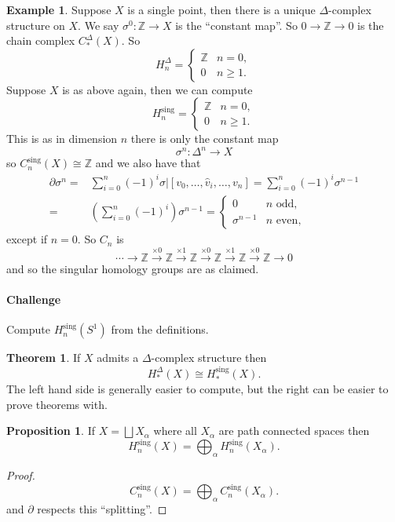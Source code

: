 \documentclass[12pt]{article}
\theoremstyle{definition}
\newtheorem*{thm}{Theorem}
\newtheorem*{prop}{Proposition}
\theoremstyle{definition}
\newtheorem*{ex}{Example}
\newcommand{\ZZ}{\mathbb{Z}}
\newcommand{\C}{C_*}
\renewcommand{\H}{H_*}
\begin{document}
\begin{ex}
Suppose $X$ is a single point, then there is a unique $\Delta$-complex structure on $X$.
We say $\sigma^0\colon \ZZ \to X$ is the ``constant map''.
So $0 \to \ZZ \to 0$ is the chain complex $\C^\Delta(X)$.
So
\[
H_n^\Delta =\begin{cases}\ZZ &n=0,\\
0 &n\ge 1.
\end{cases} 
\]
Suppose $X$ is as above again, then we can compute
\[
H_n^\text{sing} =\begin{cases}\ZZ &n=0,\\
0 &n\ge 1.
\end{cases}
\]
This is as in dimension $n$ there is only the constant map
\[
\sigma^n \colon \Delta^n \to X
\]
so $C_n^\text{sing}(X) \cong \ZZ$ and we also have that
\begin{align*}
\partial \sigma^n =& \sum_{i=0}^{n} (-1)^i \sigma|[v_0,\ldots,\hat v_i,\ldots,v_n] = \sum_{i=0}^{n} (-1)^i \sigma^{n-1}\\
=& \left(\sum_{i=0}^{n} (-1)^i\right)\sigma^{n-1} =\begin{cases}
0 &n\text{ odd},\\
\sigma^{n-1} &n\text{ even},
\end{cases}
\end{align*}
except if $n=0$.
So $C_n$ is 
\[
\cdots\to \ZZ \xrightarrow{\times 0}\ZZ \xrightarrow{\times 1}\ZZ \xrightarrow{\times 0}\ZZ \xrightarrow{\times 1}\ZZ \xrightarrow{\times 0}\ZZ \to 0
\]
and so the singular homology groups are as claimed.
\end{ex}

\paragraph{Challenge} Compute $H_n^\text{sing}(S^1)$ from the definitions.

\begin{thm}
If $X$ admits a $\Delta$-complex structure then 
\[
\H^\Delta(X) \cong \H^\text{sing}(X).
\]
The left hand side is generally easier to compute, but the right can be easier to prove theorems with.
\end{thm}

\begin{prop}
If $X = \bigsqcup X_\alpha$ where all $X_\alpha$ are path connected spaces then 
\[
H_n^\text{sing}(X) = \bigoplus_\alpha H_n^\text{sing}(X_\alpha).
\]
\end{prop}
\begin{proof}
\[
C_n^\text{sing}(X) = \bigoplus_\alpha C_n^\text{sing}(X_\alpha).
\]
and $\partial$ respects this ``splitting''.
\end{proof}
\end{document}
